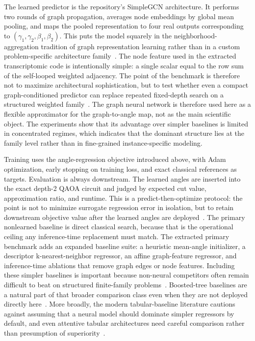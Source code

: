 \documentclass[
  reprint,
  twocolumn,
  aps,
  superscriptaddress,
  longbibliography,
  floatfix
]{revtex4-2}
\begin{document}
The learned predictor is the repository's SimpleGCN architecture. It performs two rounds of graph propagation, averages node embeddings by global mean pooling, and maps the pooled representation to four real outputs corresponding to $(\gamma_1,\gamma_2,\beta_1,\beta_2)$. This puts the model squarely in the neighborhood-aggregation tradition of graph representation learning rather than in a custom problem-specific architecture family~\cite{hamilton2017,chen2020sgc}. The node feature used in the extracted transcriptomic code is intentionally simple: a single scalar equal to the row sum of the self-looped weighted adjacency. The point of the benchmark is therefore not to maximize architectural sophistication, but to test whether even a compact graph-conditioned predictor can replace repeated fixed-depth search on a structured weighted family~\cite{corso2020,you2020design}. The graph neural network is therefore used here as a flexible approximator for the graph-to-angle map, not as the main scientific object. The experiments show that its advantage over simpler baselines is limited in concentrated regimes, which indicates that the dominant structure lies at the family level rather than in fine-grained instance-specific modeling.

Training uses the angle-regression objective introduced above, with Adam optimization, early stopping on training loss, and exact classical references as targets. Evaluation is always downstream. The learned angles are inserted into the exact depth-2 QAOA circuit and judged by expected cut value, approximation ratio, and runtime. This is a predict-then-optimize protocol: the point is not to minimize surrogate regression error in isolation, but to retain downstream objective value after the learned angles are deployed~\cite{donti2017,wilder2019}. The primary nonlearned baseline is direct classical search, because that is the operational ceiling any inference-time replacement must match. The extracted primary benchmark adds an expanded baseline suite: a heuristic mean-angle initializer, a descriptor k-nearest-neighbor regressor, an affine graph-feature regressor, and inference-time ablations that remove graph edges or node features. Including these simpler baselines is important because non-neural competitors often remain difficult to beat on structured finite-family problems~\cite{gorishniy2021,shwartz2022}. Boosted-tree baselines are a natural part of that broader comparison class even when they are not deployed directly here~\cite{chen2016xgboost,ke2017lightgbm,prokhorenkova2018}. More broadly, the modern tabular-baseline literature cautions against assuming that a neural model should dominate simpler regressors by default, and even attentive tabular architectures need careful comparison rather than presumption of superiority~\cite{arik2021,shwartz2022}.
\end{document}
